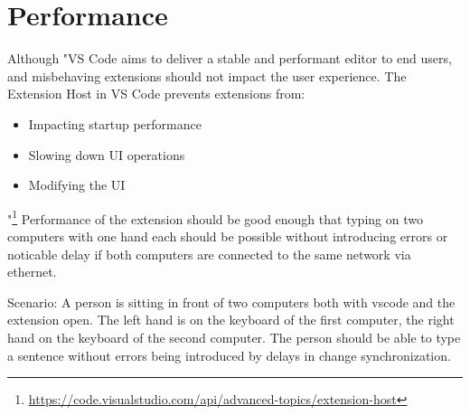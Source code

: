 \section{Performance}

Although "VS Code aims to deliver a stable and performant editor to end users, and misbehaving extensions should not impact the user experience. The Extension Host in VS Code prevents extensions from:
\begin{itemize}
    \item Impacting startup performance
    \item Slowing down UI operations
    \item Modifying the UI
\end{itemize}"\footnote{\href{https://code.visualstudio.com/api/advanced-topics/extension-host}{https://code.visualstudio.com/api/advanced-topics/extension-host}}
Performance of the extension should be good enough that typing on two computers with one hand each should be possible without introducing errors or noticable delay if both computers are connected to the same network via ethernet.

Scenario: A person is sitting in front of two computers both with vscode and the extension open. The left hand is on the keyboard of the first computer, the right hand on the keyboard of the second computer. The person should be able to type a sentence without errors being introduced by delays in change synchronization.

